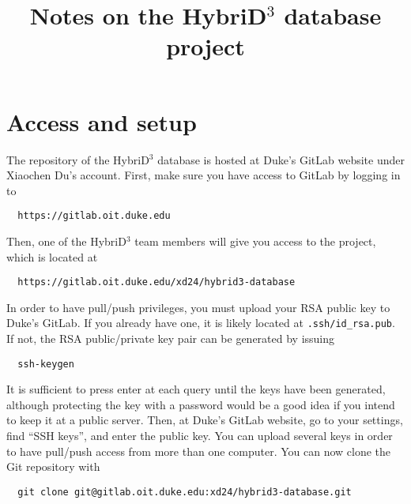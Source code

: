 \documentclass{article}
\title{Notes on the HybriD$^3$ database project}
\begin{document}
\maketitle

\tableofcontents

\section{Access and setup}

The repository of the HybriD$^3$ database is hosted at Duke's GitLab website under Xiaochen Du's account. First, make sure you have access to GitLab by logging in to
\lstset{language=Bash}
\begin{lstlisting}
  https://gitlab.oit.duke.edu
\end{lstlisting}
Then, one of the HybriD$^3$ team members will give you access to the project, which is located at
\begin{lstlisting}
  https://gitlab.oit.duke.edu/xd24/hybrid3-database
\end{lstlisting}
In order to have pull/push privileges, you must upload your RSA public key to Duke's GitLab. If you already have one, it is likely located at \verb+.ssh/id_rsa.pub+. If not, the RSA public/private key pair can be generated by issuing
\begin{lstlisting}
  ssh-keygen
\end{lstlisting}
It is sufficient to press enter at each query until the keys have been generated, although protecting the key with a password would be a good idea if you intend to keep it at a public server. Then, at Duke's GitLab website, go to your settings, find ``SSH keys'', and enter the public key. You can upload several keys in order to have pull/push access from more than one computer. You can now clone the Git repository with
\begin{lstlisting}
  git clone git@gitlab.oit.duke.edu:xd24/hybrid3-database.git
\end{lstlisting}
\end{document}
